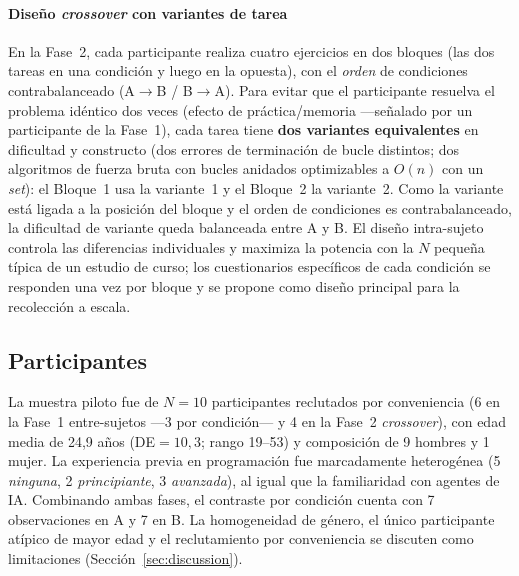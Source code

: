 \documentclass[conference]{IEEEtran}
\begin{document}
\paragraph{Dise\~no \emph{crossover} con variantes de tarea}
En la Fase~2, cada participante realiza cuatro ejercicios en dos bloques (las dos tareas en una
condici\'on y luego en la opuesta), con el \emph{orden} de condiciones contrabalanceado (A$\to$B /
B$\to$A). Para evitar que el participante resuelva el problema id\'entico dos veces (efecto de
pr\'actica/memoria ---se\~nalado por un participante de la Fase~1), cada tarea tiene \textbf{dos
variantes equivalentes} en dificultad y constructo (dos errores de terminaci\'on de bucle
distintos; dos algoritmos de fuerza bruta con bucles anidados optimizables a $O(n)$ con un \emph{set}): el Bloque~1 usa la
variante~1 y el Bloque~2 la variante~2. Como la variante est\'a ligada a la posici\'on del bloque y
el orden de condiciones es contrabalanceado, la dificultad de variante queda balanceada entre A y
B. El dise\~no intra-sujeto controla las diferencias individuales y maximiza la potencia con la $N$
peque\~na t\'ipica de un estudio de curso; los cuestionarios espec\'ificos de cada condici\'on se
responden una vez por bloque y se propone como dise\~no principal para la recolecci\'on a escala.

\subsection{Participantes}
La muestra piloto fue de $N=10$ participantes reclutados por conveniencia (6 en la Fase~1
entre-sujetos ---3 por condici\'on--- y 4 en la Fase~2 \emph{crossover}), con edad media de
24{,}9 a\~nos (DE${}=10{,}3$; rango 19--53) y composici\'on de 9 hombres y 1 mujer. La experiencia
previa en programaci\'on fue marcadamente heterog\'enea (5 \emph{ninguna}, 2 \emph{principiante},
3 \emph{avanzada}), al igual que la familiaridad con agentes de IA. Combinando ambas fases, el
contraste por condici\'on cuenta con 7 observaciones en A y 7 en B. La homogeneidad de g\'enero, el
\'unico participante at\'ipico de mayor edad y el reclutamiento por conveniencia se discuten como
limitaciones (Secci\'on~\ref{sec:discussion}).
\end{document}
